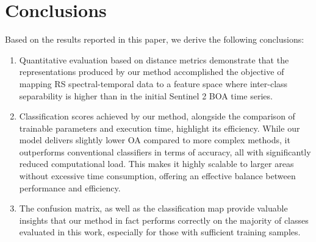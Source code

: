 \documentclass[journal,article,submit,pdftex,moreauthors]{Definitions/mdpi}
\begin{document}
\section{Conclusions}
Based on the results reported in this paper, we derive the following conclusions:
\begin{enumerate}
	\item Quantitative evaluation based on distance metrics  demonstrate that the representations produced by our method accomplished the objective of mapping RS spectral-temporal data to a feature space where inter-class separability is higher than in the initial Sentinel 2 BOA time series.
    \item Classification scores achieved by our method, alongside the comparison of trainable parameters and execution time, highlight its efficiency. While our model delivers slightly lower OA compared to more complex methods, it outperforms conventional classifiers in terms of accuracy, all with significantly reduced computational load. This makes it highly scalable to larger areas without excessive time consumption, offering an effective balance between performance and efficiency.
	\item The confusion matrix, as well as the classification map provide valuable insights that our method in fact performs correctly on the majority of classes evaluated in this work, especially for those with sufficient training samples. 
\end{enumerate}
\end{document}
